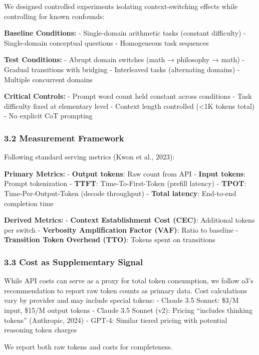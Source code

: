 \documentclass[
  11pt]{article}
\begin{document}
We designed controlled experiments isolating context-switching effects
while controlling for known confounds:

\textbf{Baseline Conditions:} - Single-domain arithmetic tasks (constant
difficulty) - Single-domain conceptual questions - Homogeneous task
sequences

\textbf{Test Conditions:} - Abrupt domain switches (math → philosophy →
math) - Gradual transitions with bridging - Interleaved tasks
(alternating domains) - Multiple concurrent domains

\textbf{Critical Controls:} - Prompt word count held constant across
conditions - Task difficulty fixed at elementary level - Context length
controlled (\textless1K tokens total) - No explicit CoT prompting

\subsubsection{3.2 Measurement Framework}\label{measurement-framework}

Following standard serving metrics (Kwon et al., 2023):

\textbf{Primary Metrics:} - \textbf{Output tokens}: Raw count from API -
\textbf{Input tokens}: Prompt tokenization - \textbf{TTFT}:
Time-To-First-Token (prefill latency) - \textbf{TPOT}:
Time-Per-Output-Token (decode throughput) - \textbf{Total latency}:
End-to-end completion time

\textbf{Derived Metrics:} - \textbf{Context Establishment Cost (CEC)}:
Additional tokens per switch - \textbf{Verbosity Amplification Factor
(VAF)}: Ratio to baseline - \textbf{Transition Token Overhead (TTO)}:
Tokens spent on transitions

\subsubsection{3.3 Cost as Supplementary
Signal}\label{cost-as-supplementary-signal}

While API costs can serve as a proxy for total token consumption, we
follow o3's recommendation to report raw token counts as primary data.
Cost calculations vary by provider and may include special tokens: -
Claude 3.5 Sonnet: \$3/M input, \$15/M output tokens - Claude 3.5 Sonnet
(v2): Pricing ``includes thinking tokens'' (Anthropic, 2024) - GPT-4:
Similar tiered pricing with potential reasoning token charges

We report both raw tokens and costs for completeness.
\end{document}
